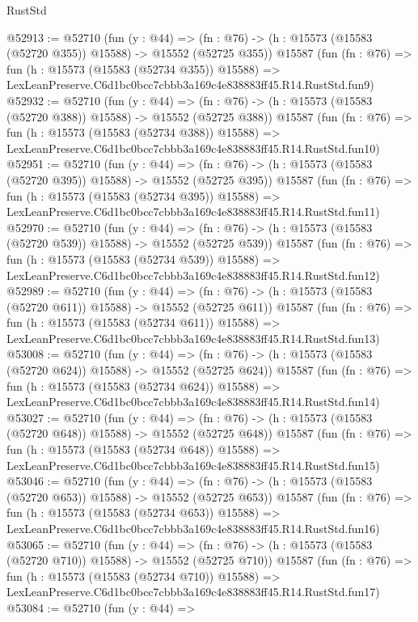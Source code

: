 \begin{lexlean}{RustStd}
\begin{coremodule}
@52913 := @52710
    (fun (y : @44) =>
    (fn : @76) -> (h : @15573 (@15583 (@52720 @355)) @15588) -> @15552 (@52725 @355))
    @15587
    (fun (fn : @76) =>
    fun (h : @15573 (@15583 (@52734 @355)) @15588) =>
    LexLeanPreserve.C6d1bc0bcc7cbbb3a169c4e838883ff45.R14.RustStd.fun9)
@52932 := @52710
    (fun (y : @44) =>
    (fn : @76) -> (h : @15573 (@15583 (@52720 @388)) @15588) -> @15552 (@52725 @388))
    @15587
    (fun (fn : @76) =>
    fun (h : @15573 (@15583 (@52734 @388)) @15588) =>
    LexLeanPreserve.C6d1bc0bcc7cbbb3a169c4e838883ff45.R14.RustStd.fun10)
@52951 := @52710
    (fun (y : @44) =>
    (fn : @76) -> (h : @15573 (@15583 (@52720 @395)) @15588) -> @15552 (@52725 @395))
    @15587
    (fun (fn : @76) =>
    fun (h : @15573 (@15583 (@52734 @395)) @15588) =>
    LexLeanPreserve.C6d1bc0bcc7cbbb3a169c4e838883ff45.R14.RustStd.fun11)
@52970 := @52710
    (fun (y : @44) =>
    (fn : @76) -> (h : @15573 (@15583 (@52720 @539)) @15588) -> @15552 (@52725 @539))
    @15587
    (fun (fn : @76) =>
    fun (h : @15573 (@15583 (@52734 @539)) @15588) =>
    LexLeanPreserve.C6d1bc0bcc7cbbb3a169c4e838883ff45.R14.RustStd.fun12)
@52989 := @52710
    (fun (y : @44) =>
    (fn : @76) -> (h : @15573 (@15583 (@52720 @611)) @15588) -> @15552 (@52725 @611))
    @15587
    (fun (fn : @76) =>
    fun (h : @15573 (@15583 (@52734 @611)) @15588) =>
    LexLeanPreserve.C6d1bc0bcc7cbbb3a169c4e838883ff45.R14.RustStd.fun13)
@53008 := @52710
    (fun (y : @44) =>
    (fn : @76) -> (h : @15573 (@15583 (@52720 @624)) @15588) -> @15552 (@52725 @624))
    @15587
    (fun (fn : @76) =>
    fun (h : @15573 (@15583 (@52734 @624)) @15588) =>
    LexLeanPreserve.C6d1bc0bcc7cbbb3a169c4e838883ff45.R14.RustStd.fun14)
@53027 := @52710
    (fun (y : @44) =>
    (fn : @76) -> (h : @15573 (@15583 (@52720 @648)) @15588) -> @15552 (@52725 @648))
    @15587
    (fun (fn : @76) =>
    fun (h : @15573 (@15583 (@52734 @648)) @15588) =>
    LexLeanPreserve.C6d1bc0bcc7cbbb3a169c4e838883ff45.R14.RustStd.fun15)
@53046 := @52710
    (fun (y : @44) =>
    (fn : @76) -> (h : @15573 (@15583 (@52720 @653)) @15588) -> @15552 (@52725 @653))
    @15587
    (fun (fn : @76) =>
    fun (h : @15573 (@15583 (@52734 @653)) @15588) =>
    LexLeanPreserve.C6d1bc0bcc7cbbb3a169c4e838883ff45.R14.RustStd.fun16)
@53065 := @52710
    (fun (y : @44) =>
    (fn : @76) -> (h : @15573 (@15583 (@52720 @710)) @15588) -> @15552 (@52725 @710))
    @15587
    (fun (fn : @76) =>
    fun (h : @15573 (@15583 (@52734 @710)) @15588) =>
    LexLeanPreserve.C6d1bc0bcc7cbbb3a169c4e838883ff45.R14.RustStd.fun17)
@53084 := @52710
    (fun (y : @44) =>

\end{coremodule}
\end{lexlean}
